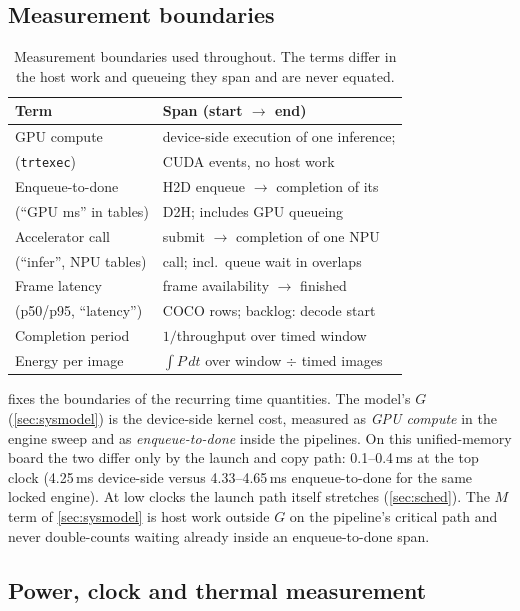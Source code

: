 \subsection{Measurement boundaries}

\begin{table}[t]
\centering
\caption{Measurement boundaries used throughout. The terms differ in the
host work and queueing they span and are never equated.}
\label{tab:measure}
\small
\footnotesize
\begin{tabular}{@{}ll@{}}
\toprule
Term & Span (start $\to$ end) \\
\midrule
GPU compute & device-side execution of one inference; \\
\quad (\texttt{trtexec}) & CUDA events, no host work \\
Enqueue-to-done & H2D enqueue $\to$ completion of its \\
\quad (``GPU ms'' in tables) & D2H; includes GPU queueing \\
Accelerator call & submit $\to$ completion of one NPU \\
\quad (``infer'', NPU tables) & call; incl.\ queue wait in overlaps \\
Frame latency & frame availability $\to$ finished \\
\quad (p50/p95, ``latency'') & COCO rows; backlog: decode start \\
Completion period & $1/{}$throughput over timed window \\
Energy per image & $\int P\,dt$ over window $\div$ timed images \\
\bottomrule
\end{tabular}
\end{table}

 fixes the boundaries of the recurring time
quantities. The model's $G$
(\cref{sec:sysmodel}) is the device-side kernel cost, measured as
\emph{GPU compute} in the engine sweep and as \emph{enqueue-to-done}
inside the pipelines. On this unified-memory board the two differ only
by the launch and copy path: 0.1--0.4\,ms at the top clock (4.25\,ms
device-side versus 4.33--4.65\,ms enqueue-to-done for the same locked
engine). At low clocks the launch path itself stretches
(\cref{sec:sched}). The $M$ term of \cref{sec:sysmodel} is host work
outside $G$ on the pipeline's critical path and never double-counts
waiting already inside an enqueue-to-done span.

\subsection{Power, clock and thermal measurement}

